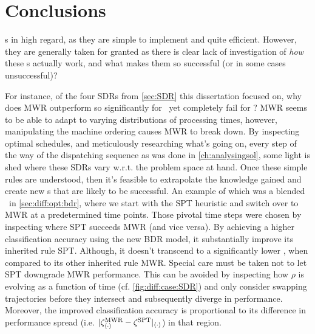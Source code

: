 
\chapter{Conclusions}\label{ch:conclusions} 
 \sdr s in high regard, as they 
are simple to implement and quite efficient. 
However, they are generally taken for granted as there is clear lack of 
investigation of \emph{how} these \dr s actually work, and what 
makes them so successful (or in some cases unsuccessful)? 

For instance, of the four SDRs from \cref{sec:SDR} this dissertation focused 
on, why does MWR outperform so significantly for \jsp\, yet completely fail for 
\fsp? 
MWR seems to be able to adapt to varying distributions of processing times, 
however, manipulating the machine ordering causes MWR to break down. 
By inspecting optimal schedules, and meticulously researching what's going on, 
every step of the way of the dispatching sequence as was done in 
\cref{ch:analysingsol}, some light is shed where these SDRs vary w.r.t. the 
problem space at hand. 
Once these simple rules are understood, then it's feasible to extrapolate the 
knowledge gained and create new \cdr s that are likely to be successful. 
An example of which was a blended \dr\ in \cref{sec:diff:opt:bdr}, where we 
start with the SPT heuristic and switch over to MWR at a predetermined time 
points. Those pivotal time steps were chosen by inspecting where SPT succeeds 
MWR (and vice versa). 
By achieving a higher classification accuracy using the new BDR model, it 
substantially improve its inherited rule SPT.
Although, it doesn't transcend to a significantly lower \namerho, when compared 
to its other inherited rule MWR. 
Special care must be taken not to let SPT downgrade MWR performance. This can 
be avoided by inspecting how $\rho$ is evolving as a function of time (cf. 
\cref{fig:diff:case:SDR}) and only consider swapping trajectories before they 
intersect and subsequently diverge in performance. 
Moreover, the improved classification accuracy is proportional to its 
difference in performance spread (i.e. 
$\lvert\zeta^{\text{MWR}}_{\langle \cdot \rangle} - \zeta^{\text{SPT}}\rvert_{\langle \cdot \rangle}$) in that region.

